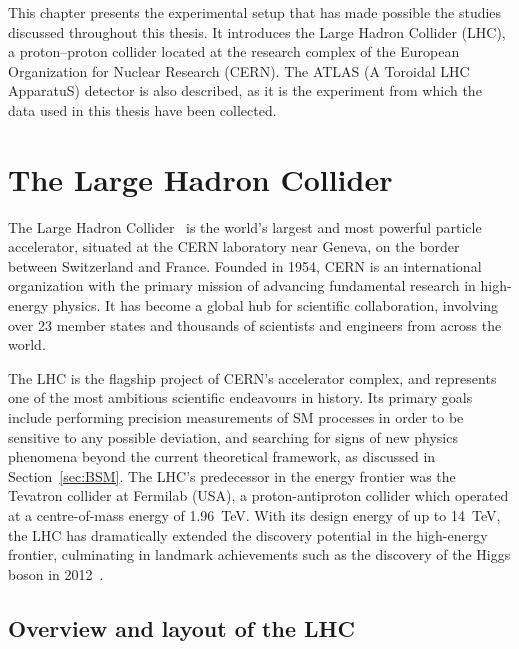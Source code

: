 This chapter presents the experimental setup that has made possible the studies discussed throughout this thesis. It introduces the Large Hadron Collider (LHC), a proton--proton collider located at the research complex of the European Organization for Nuclear Research (CERN). The ATLAS (A Toroidal LHC ApparatuS) detector is also described, as it is the experiment from which the data used in this thesis have been collected.

\section{The Large Hadron Collider}
\label{sec:LHC}

The Large Hadron Collider~\cite{Lyndon:Evans_2008,Brüning:782076} is the world's largest and most powerful particle accelerator, situated at the CERN laboratory near Geneva, on the border between Switzerland and France. Founded in 1954, CERN is an international organization with the primary mission of advancing fundamental research in high-energy physics. It has become a global hub for scientific collaboration, involving over 23 member states and thousands of scientists and engineers from across the world.

The LHC is the flagship project of CERN's accelerator complex, and represents one of the most ambitious scientific endeavours in history. Its primary goals include performing precision measurements of SM processes in order to be sensitive to any possible deviation, and searching for signs of new physics phenomena beyond the current theoretical framework, as discussed in Section~\ref{sec:BSM}. The LHC's predecessor in the energy frontier was the Tevatron collider at Fermilab (USA), a proton-antiproton collider which operated at a centre-of-mass energy of 1.96~TeV. With its design energy of up to 14~TeV, the LHC has dramatically extended the discovery potential in the high-energy frontier, culminating in landmark achievements such as the discovery of the Higgs boson in 2012~\cite{ATLAS:2012yve,CMS:2012qbp}.

\subsection{Overview and layout of the LHC}

